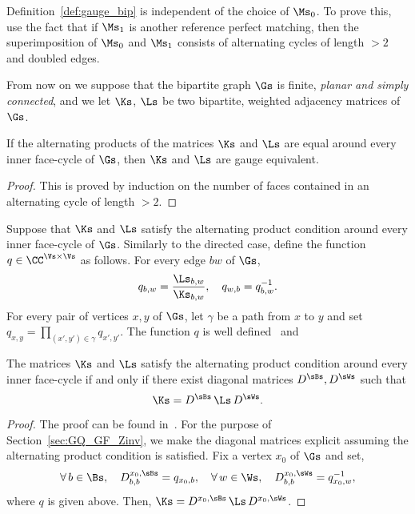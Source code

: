 \documentclass[a4paper,twoside,11pt]{article}
\begin{document}
\begin{rem}
Definition~\ref{def:gauge_bip} is independent of the choice of $\Ms_0$. To prove this, use the fact that if $\Ms_1$ is another
reference perfect matching, then the superimposition of $\Ms_0$ and $\Ms_1$ consists of alternating cycles of length $>2$ and 
doubled edges. 
\end{rem}

From now on we suppose that the bipartite graph $\Gs$ is finite, \emph{planar and simply connected}, and we let $\Ks$, $\Ls$ be two bipartite,
weighted adjacency matrices of $\Gs$. 

\begin{lem}\label{lem:gauge_bip_equiv}
If the alternating products of the matrices $\Ks$ and $\Ls$ are equal around 
every inner face-cycle of $\Gs$, then $\Ks$ and $\Ls$ are gauge equivalent.
\end{lem}
\begin{proof}
This is proved by induction on the number of faces contained in an alternating cycle of length $>2$.
\end{proof}

Suppose that $\Ks$ and $\Ls$ satisfy the alternating product condition around every inner face-cycle of $\Gs$. Similarly
to the directed case, define the function $q\in\CC^{\Vs\times\Vs}$ as follows. For every edge $bw$ of $\Gs$, 
\[
q_{b,w}=\frac{\Ls_{b,w}}{\Ks_{b,w}},\quad q_{w,b}=q_{b,w}^{-1}.
\]
For every pair of vertices $x,y$ of $\Gs$, let $\gamma$ be a path from $x$ to $y$ and set $q_{x,y}=\prod_{(x',y')\in\gamma}q_{x',y'}$. 
The function $q$ is well defined~\cite{Kuperberg} and

\begin{lem}
The matrices $\Ks$ and $\Ls$ satisfy the alternating product condition around every inner face-cycle if and only if there exist
diagonal matrices $D^{\sBs},D^{\sWs}$ such that 
\[
\Ks=D^{\sBs}\,\Ls\,D^{\sWs}.
\]
\end{lem}
\begin{proof}
The proof can be found in~\cite{Kuperberg}. For the purpose of Section~\ref{sec:GQ_GF_Zinv}, we make the diagonal matrices explicit assuming the alternating
product condition is satisfied. Fix a vertex $x_0$ of $\Gs$ and set,
\begin{equation*}
\forall\,b\in \Bs,\quad D^{x_0,\sBs}_{b,b}=q_{x_0,b}, \quad \forall\,w\in \Ws,\quad D^{x_0,\sWs}_{b,b}=q_{x_0,w}^{-1},
\end{equation*}
where $q$ is given above. Then, $\Ks=D^{x_0,\sBs}\,\Ls\,D^{x_0,\sWs}$.
\end{proof}
\end{document}
